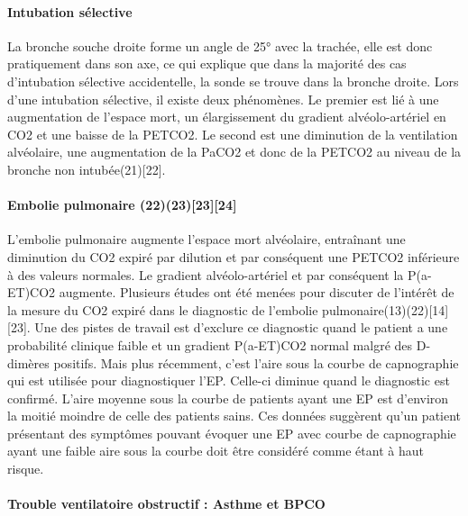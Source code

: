 \documentclass[12pt,]{article}
\let\oldparagraph\paragraph
\renewcommand{\paragraph}[1]{\oldparagraph{#1}\mbox{}}
\begin{document}
\paragraph{Intubation sélective}\label{intubation-selective}

La bronche souche droite forme un angle de 25° avec la trachée, elle est
donc pratiquement dans son axe, ce qui explique que dans la majorité des
cas d'intubation sélective accidentelle, la sonde se trouve dans la
bronche droite. Lors d'une intubation sélective, il existe deux
phénomènes. Le premier est lié à une augmentation de l'espace mort, un
élargissement du gradient alvéolo-artériel en CO2 et une baisse de la
PETCO2. Le second est une diminution de la ventilation alvéolaire, une
augmentation de la PaCO2 et donc de la PETCO2 au niveau de la bronche
non intubée(21){[}22{]}.

\paragraph{Embolie pulmonaire
(22)(23){[}23{]}{[}24{]}}\label{embolie-pulmonaire-2223kline1998preliminarywiegand2000effectiveness}

L'embolie pulmonaire augmente l'espace mort alvéolaire, entraînant une
diminution du CO2 expiré par dilution et par conséquent une PETCO2
inférieure à des valeurs normales. Le gradient alvéolo-artériel et par
conséquent la P(a-ET)CO2 augmente. Plusieurs études ont été menées pour
discuter de l'intérêt de la mesure du CO2 expiré dans le diagnostic de
l'embolie pulmonaire(13)(22){[}14{]}{[}23{]}. Une des pistes de travail
est d'exclure ce diagnostic quand le patient a une probabilité clinique
faible et un gradient P(a-ET)CO2 normal malgré des D-dimères positifs.
Mais plus récemment, c'est l'aire sous la courbe de capnographie qui est
utilisée pour diagnostiquer l'EP. Celle-ci diminue quand le diagnostic
est confirmé. L'aire moyenne sous la courbe de patients ayant une EP est
d'environ la moitié moindre de celle des patients sains. Ces données
suggèrent qu'un patient présentant des symptômes pouvant évoquer une EP
avec courbe de capnographie ayant une faible aire sous la courbe doit
être considéré comme étant à haut risque.

\paragraph{Trouble ventilatoire obstructif : Asthme et
BPCO}\label{trouble-ventilatoire-obstructif-asthme-et-bpco}
\end{document}
